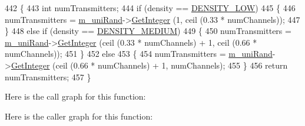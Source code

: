\begin{DoxyCode}
442 \{
443   \textcolor{keywordtype}{int} numTransmitters;
444   \textcolor{keywordflow}{if} (density == \hyperlink{classns3_1_1TvSpectrumTransmitterHelper_a71a2f35d9d4b50ea4840a18bfba6dba7a85fe28ac3b33f00d0a1bb919b69f60d9}{DENSITY\_LOW})
445     \{
446       numTransmitters = \hyperlink{classns3_1_1TvSpectrumTransmitterHelper_ac0914f5455dbfa49826f0879635693e6}{m\_uniRand}->\hyperlink{classns3_1_1RandomVariableStream_a66cd94e6305ce7f000f1a9ff0fcb9aef}{GetInteger} (1, ceil (0.33 * numChannels));
447     \}
448   \textcolor{keywordflow}{else} \textcolor{keywordflow}{if} (density == \hyperlink{classns3_1_1TvSpectrumTransmitterHelper_a71a2f35d9d4b50ea4840a18bfba6dba7a73f07e5c6ddd8eaae068f515708620d2}{DENSITY\_MEDIUM})
449     \{
450       numTransmitters = \hyperlink{classns3_1_1TvSpectrumTransmitterHelper_ac0914f5455dbfa49826f0879635693e6}{m\_uniRand}->\hyperlink{classns3_1_1RandomVariableStream_a66cd94e6305ce7f000f1a9ff0fcb9aef}{GetInteger} (ceil (0.33 * numChannels) + 1, ceil (0.66
       * numChannels));
451     \}  
452   \textcolor{keywordflow}{else}
453     \{
454       numTransmitters = \hyperlink{classns3_1_1TvSpectrumTransmitterHelper_ac0914f5455dbfa49826f0879635693e6}{m\_uniRand}->\hyperlink{classns3_1_1RandomVariableStream_a66cd94e6305ce7f000f1a9ff0fcb9aef}{GetInteger} (ceil (0.66 * numChannels) + 1, 
      numChannels);
455     \}  
456   \textcolor{keywordflow}{return} numTransmitters;
457 \}
\end{DoxyCode}


Here is the call graph for this function\+:




Here is the caller graph for this function\+:


